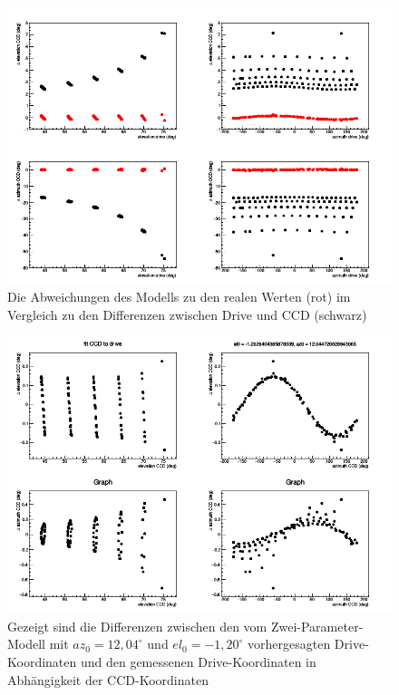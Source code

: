 \begin{figure}[htbp]
\centering
\includegraphics[width=\textwidth]{../341/C2Dcomp.png}
\caption{Die Abweichungen des Modells zu den realen Werten (rot) im Vergleich zu den Differenzen zwischen Drive und CCD (schwarz)}
\label{img:C2Dcomp}
\end{figure}
\begin{figure}[htbp]
\centering
\includegraphics[width=\textwidth]{../341/C2D.png}
\caption{Gezeigt sind die Differenzen zwischen den vom Zwei-Parameter-Modell mit $az_0=12,04^{\circ}$ und $el_0=-1,20^{\circ}$ vorhergesagten Drive-Koordinaten und den gemessenen Drive-Koordinaten in Abhängigkeit der CCD-Koordinaten}
\label{img:C2D}
\end{figure}
